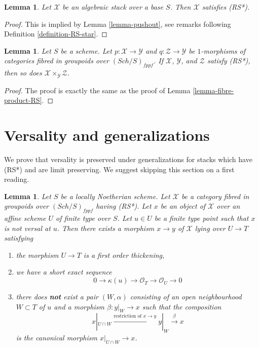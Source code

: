 \documentclass{stacks-project}
\theoremstyle{plain}
\newtheorem{lemma}[subsection]{Lemma}
\theoremstyle{definition}
\theoremstyle{remark}
\numberwithin{equation}{subsection}
\def\Sch{\mathit{Sch}}
\begin{document}
\begin{lemma}
\label{lemma-algebraic-stack-RS-star}
Let $\mathcal{X}$ be an algebraic stack over a base $S$.
Then $\mathcal{X}$ satisfies (RS*).
\end{lemma}

\begin{proof}
This is implied by Lemma \ref{lemma-pushout}, see
remarks following Definition \ref{definition-RS-star}.
\end{proof}

\begin{lemma}
\label{lemma-fibre-product-RS-star}
Let $S$ be a scheme. Let $p : \mathcal{X} \to \mathcal{Y}$ and
$q : \mathcal{Z} \to \mathcal{Y}$ be $1$-morphisms of categories
fibred in groupoids over $(\Sch/S)_{fppf}$. If $\mathcal{X}$, $\mathcal{Y}$,
and $\mathcal{Z}$ satisfy (RS*), then so
does $\mathcal{X} \times_\mathcal{Y} \mathcal{Z}$.
\end{lemma}

\begin{proof}
The proof is exactly the same as the proof of
Lemma \ref{lemma-fibre-product-RS}.
\end{proof}








\section{Versality and generalizations}
\label{section-generalize-versality}

\noindent
We prove that versality is preserved under generalizations
for stacks which have (RS*) and are limit preserving.
We suggest skipping this section on a first reading.

\begin{lemma}
\label{lemma-single-point}
Let $S$ be a locally Noetherian scheme. Let $\mathcal{X}$ be a category
fibred in groupoids over $(\Sch/S)_{fppf}$ having (RS*).
Let $x$ be an object of $\mathcal{X}$ over an affine scheme $U$
of finite type over $S$. Let $u \in U$ be a finite type point such that
$x$ is not versal at $u$. Then there exists a morphism $x \to y$
of $\mathcal{X}$ lying over $U \to T$ satisfying
\begin{enumerate}
\item the morphism $U \to T$ is a first order thickening,
\item we have a short exact sequence
$$
0 \to \kappa(u) \to \mathcal{O}_T \to \mathcal{O}_U \to 0
$$
\item there does {\bf not} exist a pair $(W, \alpha)$
consisting of an open neighbourhood $W \subset T$ of $u$
and a morphism $\beta : y|_W \to x$ such that the composition
$$
x|_{U \cap W} \xrightarrow{\text{restriction of }x \to y}
y|_W \xrightarrow{\beta} x
$$
is the canonical morphism $x|_{U \cap W} \to x$.
\end{enumerate}
\end{lemma}
\end{document}
